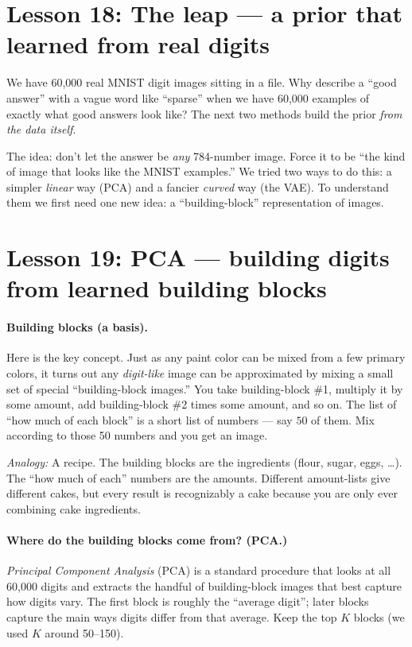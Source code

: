 \documentclass[11pt]{article}
\newcommand{\analogy}[1]{\par\smallskip\noindent\textit{Analogy:} #1\par\smallskip}
\begin{document}
\section{Lesson 18: The leap --- a prior that learned from real digits}

We have 60{,}000 real MNIST digit images sitting in a file. Why describe a
``good answer'' with a vague word like ``sparse'' when we have 60{,}000
examples of exactly what good answers look like? The next two methods build
the prior \emph{from the data itself}.

The idea: don't let the answer be \emph{any} 784-number image. Force it to be
``the kind of image that looks like the MNIST examples.'' We tried two ways to
do this: a simpler \emph{linear} way (PCA) and a fancier \emph{curved} way
(the VAE). To understand them we first need one new idea: a ``building-block''
representation of images.

\section{Lesson 19: PCA --- building digits from learned building blocks}

\paragraph{Building blocks (a basis).} Here is the key concept. Just as any
paint color can be mixed from a few primary colors, it turns out any
\emph{digit-like} image can be approximated by mixing a small set of special
``building-block images.'' You take building-block \#1, multiply it by some
amount, add building-block \#2 times some amount, and so on. The list of ``how
much of each block'' is a short list of numbers --- say $50$ of them. Mix
according to those 50 numbers and you get an image.

\analogy{A recipe. The building blocks are the ingredients (flour, sugar,
eggs, \dots). The ``how much of each'' numbers are the amounts. Different
amount-lists give different cakes, but every result is recognizably a cake
because you are only ever combining cake ingredients.}

\paragraph{Where do the building blocks come from? (PCA.)} \emph{Principal
Component Analysis} (PCA) is a standard procedure that looks at all 60{,}000
digits and extracts the handful of building-block images that best capture how
digits vary. The first block is roughly the ``average digit''; later blocks
capture the main ways digits differ from that average. Keep the top $K$ blocks
(we used $K$ around 50--150).
\end{document}
